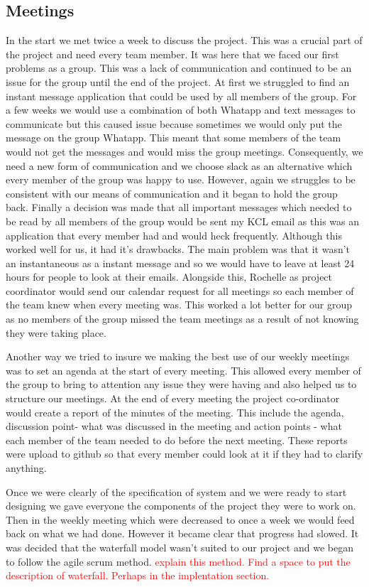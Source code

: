 \documentclass{article}
\begin{document}
\subsection{Meetings}
 In the start we met twice a week to discuss the project. 
 This was a crucial part of the project and need every team member. 
 It was here that we faced our first problems as a group. 
 This was a lack of communication and continued to be an issue for the group until the end of the project. 
 At first we struggled to find an instant message application that could be used by all members of the group. 
 For a few weeks we would use a combination of both Whatapp and text messages to communicate but this caused issue because sometimes we would only put the message on the group Whatapp. 
 This meant that some members of the team would not get the messages and would miss the group meetings. 
 Consequently, we need a new form of communication and we choose slack as an alternative which every member of the group was happy to use. 
 However, again we struggles to be consistent with our means of communication and it began to hold the group back. 
 Finally a decision was made that all important messages which needed to be read by all members of the group would be sent my KCL email as this was an application that every member had and would heck frequently. 
 Although this worked well for us, it had it's drawbacks. 
 The main problem was that it wasn't an instantaneous as a instant message and so we would have to leave at least 24 hours for people to look at their emails. 
 Alongside this, Rochelle as project coordinator would send our calendar request for all meetings so each member of the team knew when every meeting was. 
 This worked a lot better for our group as no members of the group missed the team meetings as a result of not knowing they were taking place. 
 
 Another way we tried to insure we making the best use of our weekly meetings was to set an agenda at the start of every meeting. 
 This allowed every member of the group to bring to attention any issue they were having and also helped us to structure our meetings. 
 At the end of every meeting the project co-ordinator would create a report of the minutes of the meeting. This include the agenda, discussion point- what was discussed in the meeting and action points - what each member of the team needed to do before the next meeting. 
 These reports were upload to github so that every member could look at it if they had to clarify anything.
 
 Once we were clearly of the specification of system and we were ready to start designing we gave everyone the components of the project they were to work on. Then in the weekly meeting which were decreased to once a week we would feed back on what we had done. However it became clear that progress had slowed. It was decided that the waterfall model wasn't suited to our project and we began to follow the agile scrum method. \textcolor{red}{explain this method. Find a space to put the description of waterfall. Perhaps in the implentation section.}
 
\end{document}
